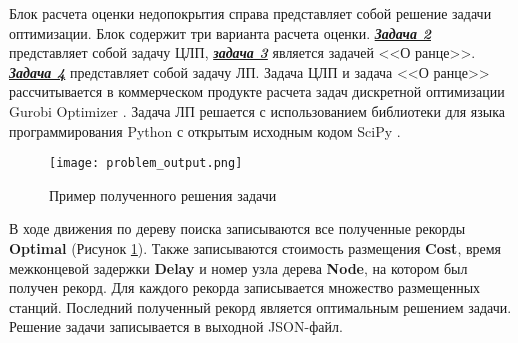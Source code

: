 Блок расчета оценки недопокрытия справа представляет собой решение задачи оптимизации. Блок содержит три варианта расчета оценки. \underline{\textit{\textbf{Задача 2}}} представляет собой задачу ЦЛП, \underline{\textit{\textbf{задача 3}}} является задачей <<О ранце>>. \underline{\textit{\textbf{Задача 4}}} представляет собой задачу ЛП. Задача ЦЛП и задача <<О ранце>> рассчитывается в коммерческом продукте расчета задач дискретной оптимизации Gurobi Optimizer \cite{gurobi}. Задача ЛП решается с использованием библиотеки для языка программирования Python с открытым исходным кодом SciPy \cite{scipy}. 


\begin{figure}[h!]
  \centering
   \texttt{[image: problem\_output.png]}
\caption{Пример полученного решения задачи}
\label{fig:part4_problem_output}
\end{figure}

В ходе движения по дереву поиска записываются все полученные рекорды \textbf{Optimal} (Рисунок \cref{fig:part4_problem_output}). Также записываются стоимость размещения \textbf{Cost}, время межконцевой задержки \textbf{Delay} и номер узла дерева \textbf{Node}, на котором был получен рекорд. Для каждого рекорда записывается множество размещенных станций. Последний полученный рекорд является оптимальным решением задачи. Решение задачи записывается в выходной JSON-файл.







